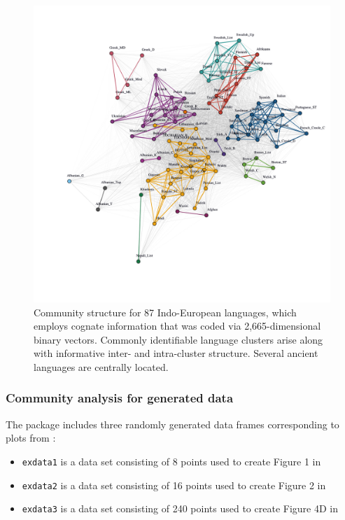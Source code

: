 \begin{Schunk}
\begin{figure}
\includegraphics[width=1\linewidth]{fig6} \caption[Community structure for 87 Indo-European languages, which employs cognate information that was coded via 2,665-dimensional binary vectors]{Community structure for 87 Indo-European languages, which employs cognate information that was coded via 2,665-dimensional binary vectors. Commonly identifiable language clusters arise along with informative inter- and intra-cluster structure. Several ancient languages are centrally located.}\label{fig:figlang}
\end{figure}
\end{Schunk}

\hypertarget{community-analysis-for-generated-data}{%
\subsubsection{Community analysis for generated
data}\label{community-analysis-for-generated-data}}

The  package includes three randomly generated data frames
corresponding to plots from \citet{berenhaut2022social}:

\begin{itemize}
\tightlist
\item
  \texttt{exdata1} is a data set consisting of 8 points used to create
  Figure 1 in \citet{berenhaut2022social}
\item
  \texttt{exdata2} is a data set consisting of 16 points used to create
  Figure 2 in \citet{berenhaut2022social}
\item
  \texttt{exdata3} is a data set consisting of 240 points used to create
  Figure 4D in \citet{berenhaut2022social}
\end{itemize}

